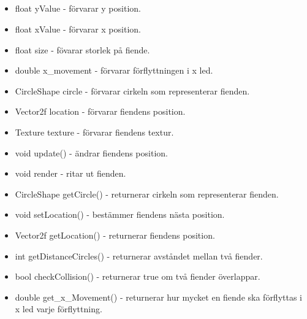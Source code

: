 \documentclass{TDP005mall}
\begin{document}
\subsection{}

\begin{itemize}

\item float yValue - förvarar y position.
\item float xValue - förvarar x position.
\item float size - fövarar storlek på fiende.
\item double x\_movement - förvarar förflyttningen i x led.
\item CircleShape circle - förvarar cirkeln som representerar fienden.
\item Vector2f location - förvarar fiendens position.
\item Texture texture - förvarar fiendens textur.
\item void update() - ändrar fiendens position.
\item void render - ritar ut fienden.
\item CircleShape getCircle() - returnerar cirkeln som representerar fienden.
\item void setLocation() - bestämmer fiendens nästa position.
\item Vector2f getLocation() - returnerar fiendens position.
\item int getDistanceCircles() - returnerar avståndet mellan två fiender.
\item bool checkCollision() - returnerar true om två fiender överlappar.
\item double get\_x\_Movement() - returnerar hur mycket en fiende ska förflyttas i x led varje förflyttning.
  
\end{itemize}
\end{document}
